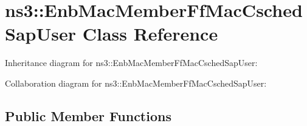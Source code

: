 \hypertarget{classns3_1_1EnbMacMemberFfMacCschedSapUser}{}\section{ns3\+:\+:Enb\+Mac\+Member\+Ff\+Mac\+Csched\+Sap\+User Class Reference}
\label{classns3_1_1EnbMacMemberFfMacCschedSapUser}


Inheritance diagram for ns3\+:\+:Enb\+Mac\+Member\+Ff\+Mac\+Csched\+Sap\+User\+:


Collaboration diagram for ns3\+:\+:Enb\+Mac\+Member\+Ff\+Mac\+Csched\+Sap\+User\+:
\subsection*{Public Member Functions}

